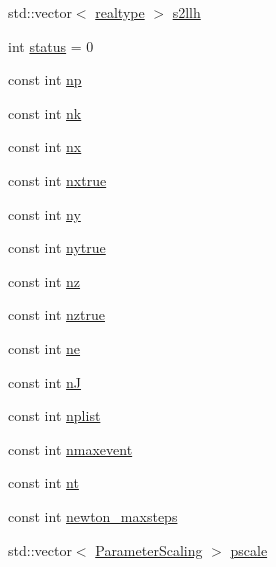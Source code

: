 \begin{DoxyCompactItemize}
\item 
std\+::vector$<$ \mbox{\hyperlink{namespaceamici_a1bdce28051d6a53868f7ccbf5f2c14a3}{realtype}} $>$ \mbox{\hyperlink{classamici_1_1_return_data_a4087bea95b64c7ecc21bb4c487b255d9}{s2llh}}
\item 
int \mbox{\hyperlink{classamici_1_1_return_data_a6e27f49150e9a14580fb313cc2777e00}{status}} = 0
\item 
const int \mbox{\hyperlink{classamici_1_1_return_data_a72e833f8ef129cac553feb1167223bc3}{np}}
\item 
const int \mbox{\hyperlink{classamici_1_1_return_data_a5e273eaccc1df0343f5a1d4d136f2f2c}{nk}}
\item 
const int \mbox{\hyperlink{classamici_1_1_return_data_a4f88110916f09b2adef33396203ff015}{nx}}
\item 
const int \mbox{\hyperlink{classamici_1_1_return_data_acf5766cc8560edbdcec5b8ef79459239}{nxtrue}}
\item 
const int \mbox{\hyperlink{classamici_1_1_return_data_a811734e12750524808dba01c57e92c66}{ny}}
\item 
const int \mbox{\hyperlink{classamici_1_1_return_data_a54bcfe56ad0df183516d096adf4e0b26}{nytrue}}
\item 
const int \mbox{\hyperlink{classamici_1_1_return_data_aa406c307f97060d218bc1fe594dfd08f}{nz}}
\item 
const int \mbox{\hyperlink{classamici_1_1_return_data_a9a451378ba5572ef7a3fd4dd89e1c227}{nztrue}}
\item 
const int \mbox{\hyperlink{classamici_1_1_return_data_a07d5274358ec39bfec473cd212a3cb78}{ne}}
\item 
const int \mbox{\hyperlink{classamici_1_1_return_data_a0d2f49d2b15b08628451261e52f56e4f}{nJ}}
\item 
const int \mbox{\hyperlink{classamici_1_1_return_data_a2375af1667e955ed7a61ade0868f735a}{nplist}}
\item 
const int \mbox{\hyperlink{classamici_1_1_return_data_a48832d4f3a37c4fd75cc7f4ef578d1b1}{nmaxevent}}
\item 
const int \mbox{\hyperlink{classamici_1_1_return_data_a21dcbe77c07eeefce79fcacdbe5f1262}{nt}}
\item 
const int \mbox{\hyperlink{classamici_1_1_return_data_a871e64bbfbd5881a86f21aaff42c3dec}{newton\+\_\+maxsteps}}
\item 
std\+::vector$<$ \mbox{\hyperlink{namespaceamici_a42f062082226e9284c201d9eab71a3a0}{Parameter\+Scaling}} $>$ \mbox{\hyperlink{classamici_1_1_return_data_a5d1c7237dc998202fe1b3393b50f77ce}{pscale}}

\end{DoxyCompactItemize}
